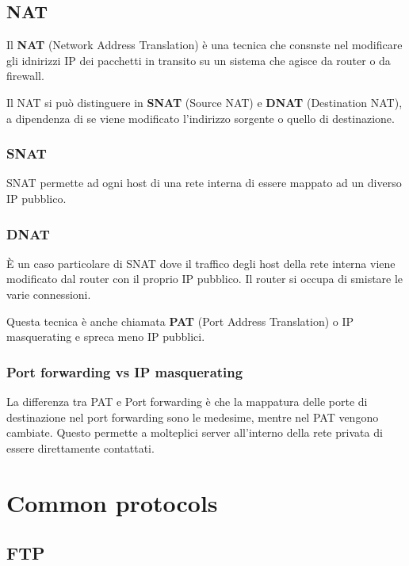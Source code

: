 \documentclass[a4paper]{article}
\begin{document}
\subsection{NAT}

Il \textbf{NAT} (Network Address Translation)
è una tecnica che consnste nel modificare gli idnirizzi IP dei pacchetti
in transito su un sistema che agisce da router o da firewall.

Il NAT si può distinguere in
\textbf{SNAT} (Source NAT) e \textbf{DNAT} (Destination NAT), a
dipendenza di se viene modificato l'indirizzo sorgente o quello
di destinazione.

\subsubsection{SNAT}

SNAT permette ad ogni host di una rete interna
di essere mappato ad un diverso IP pubblico.

\subsubsection{DNAT}

È un caso particolare di SNAT dove il traffico degli host della rete interna viene modificato dal
router con il proprio IP pubblico. Il router si occupa di smistare
le varie connessioni.

Questa tecnica è anche chiamata \textbf{PAT} (Port Address Translation)
 o IP masquerating e spreca meno IP pubblici.

\subsubsection{Port forwarding vs IP masquerating}

La differenza tra PAT e Port forwarding è che la mappatura
delle porte di destinazione nel port forwarding sono le medesime,
mentre nel PAT vengono cambiate. Questo permette a molteplici server
all'interno della rete privata di essere direttamente contattati.

\pagebreak

\section{Common protocols}

\subsection{FTP}
\end{document}
